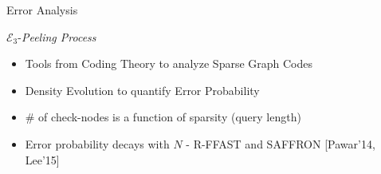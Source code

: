 \begin{frame}{Error Analysis}
{		\begin{block}{$\mathcal{E}_3${-\it Peeling Process}}
		\begin{itemize}
			\item Tools from Coding Theory to analyze Sparse Graph Codes
			\item Density Evolution to quantify Error Probability
			\item \# of check-nodes is a function of sparsity (query length)
			\item Error probability decays with $N$ - {\small R-FFAST and SAFFRON [Pawar'14, Lee'15]}
		\end{itemize}
		\end{block}
	}	
	
\end{frame}

